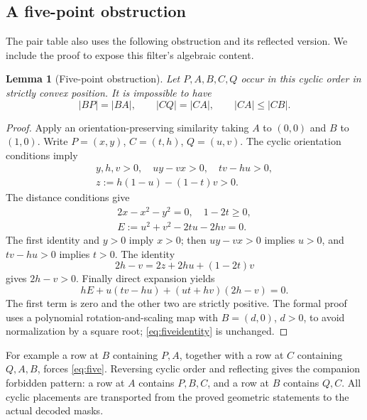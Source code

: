 \documentclass[11pt,a4paper]{article}
\newtheorem{lemma}[theorem]{Lemma}
\theoremstyle{definition}
\begin{document}
\subsection{A five-point obstruction}\label{sec:fivepoint}
The pair table also uses the following obstruction and its reflected version. We include the proof to expose this filter's algebraic content.
\begin{lemma}[Five-point obstruction]\label{lem:five}
Let $P,A,B,C,Q$ occur in this cyclic order in strictly convex position. It is impossible to have
\begin{equation}\label{eq:five}
 |BP|=|BA|,\qquad |CQ|=|CA|,\qquad |CA|\le |CB|.
\end{equation}
\end{lemma}
\begin{proof}
Apply an orientation-preserving similarity taking $A$ to $(0,0)$ and $B$ to $(1,0)$. Write $P=(x,y)$, $C=(t,h)$, $Q=(u,v)$. The cyclic orientation conditions imply
\begin{gather*}
 y,h,v>0,\quad uy-vx>0,\quad tv-hu>0,\\
 z:=h(1-u)-(1-t)v>0.
\end{gather*}
The distance conditions give
\[
 \begin{gathered}2x-x^2-y^2=0,\quad 1-2t\ge0,\\
 E:=u^2+v^2-2tu-2hv=0.\end{gathered}
\]
The first identity and $y>0$ imply $x>0$; then $uy-vx>0$ implies $u>0$, and $tv-hu>0$ implies $t>0$. The identity
\[
 2h-v=2z+2hu+(1-2t)v
\]
gives $2h-v>0$. Finally direct expansion yields
\begin{equation}\label{eq:fiveidentity}
 hE+u(tv-hu)+(ut+hv)(2h-v)=0.
\end{equation}
The first term is zero and the other two are strictly positive. The formal proof uses a polynomial rotation-and-scaling map with $B=(d,0)$, $d>0$, to avoid normalization by a square root; \eqref{eq:fiveidentity} is unchanged.
\end{proof}
For example a row at $B$ containing $P,A$, together with a row at $C$ containing $Q,A,B$, forces \eqref{eq:five}. Reversing cyclic order and reflecting gives the companion forbidden pattern: a row at $A$ contains $P,B,C$, and a row at $B$ contains $Q,C$. All cyclic placements are transported from the proved geometric statements to the actual decoded masks.
\end{document}
